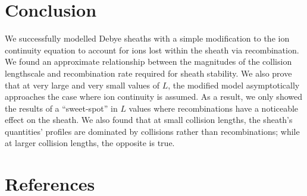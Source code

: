 \documentclass[aip,apl,reprint]{revtex4-1}
\begin{document}
	\section{Conclusion}
	We successfully modelled Debye sheaths with a simple modification to the ion continuity equation to account for ions lost within the sheath via recombination. We found an approximate relationship between the magnitudes of the collision lengthscale and recombination rate required for sheath stability. We also prove that at very large and very small values of $L$, the modified model asymptotically approaches the case where ion continuity is assumed. As a result, we only showed the results of a ``sweet-spot'' in $L$ values where recombinations have a noticeable effect on the sheath. We also found that at small collision lengths, the sheath's quantities' profiles are dominated by collisions rather than recombinations; while at larger collision lengths, the opposite is true.
	\section{References}
	

	
\end{document}
